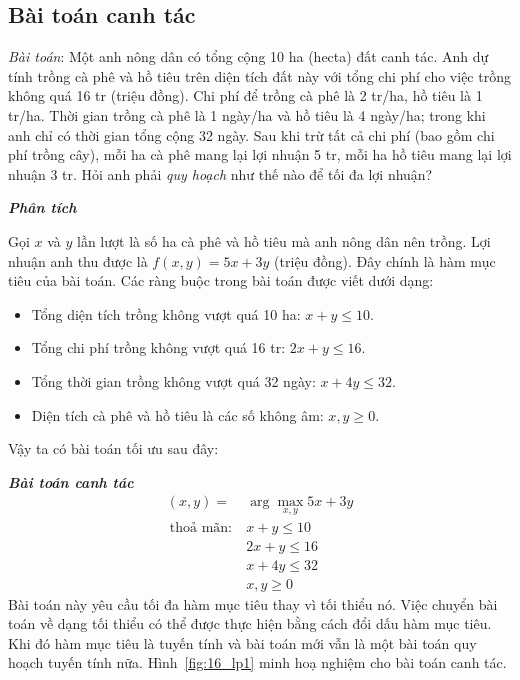 
 
\subsection{Bài toán canh tác}
 
\textit{{Bài toán}}:
Một anh nông dân có tổng cộng 10 ha (hecta) đất canh tác. Anh dự tính trồng cà
phê và hồ tiêu trên diện tích đất này với tổng chi phí cho việc trồng không quá 16 tr (triệu đồng). Chi phí để trồng cà phê là 2 tr/ha, hồ
tiêu là 1 tr/ha. Thời gian trồng cà phê là 1 ngày/ha và hồ tiêu là 4 ngày/ha;
trong khi anh chỉ có thời gian tổng cộng 32 ngày. Sau khi trừ tất cả chi
phí (bao gồm chi phí trồng cây), mỗi ha cà phê mang lại lợi nhuận 5 tr, mỗi ha hồ
tiêu mang lại lợi nhuận 3 tr. Hỏi anh phải \textit{quy hoạch} như thế nào để tối
đa lợi nhuận? 
 
\newpage 
\textit{\textbf{Phân tích}}

Gọi $x$ và $y$ lần lượt là số ha cà phê và hồ tiêu mà anh nông dân nên trồng.
Lợi nhuận anh thu được là $f(x, y) = 5x + 3y$ (triệu đồng). Đây chính là hàm
mục tiêu của bài toán. Các ràng buộc trong bài toán được viết dưới dạng:
\begin{itemize}
    \item Tổng diện tích trồng không vượt quá 10 ha: $x + y \leq 10$. 
     
    \item Tổng chi phí trồng không vượt quá 16 tr: $2x + y \leq 16$. 
     
    \item Tổng thời gian trồng không vượt quá 32 ngày: $x + 4y \leq 32$. 
     
    \item Diện tích cà phê và hồ tiêu là các số không âm: $x, y \geq 0$. 
\end{itemize}
Vậy ta có bài toán tối ưu sau đây: 


\textit{\textbf{Bài toán canh tác} }
\begin{equation}
\label{eqn:canhtac}
\begin{aligned}
    (x, y) =& \arg\max_{x, y} 5x + 3y \\\ 
    \text{thoả mãn:}~ & x + y \leq 10 \\\ 
                        & 2x + y \leq 16 \\\ 
                        & x + 4y \leq 32 \\\ 
                        & x, y \geq 0 
\end{aligned} 
\end{equation} 
Bài toán này yêu cầu {tối đa hàm mục tiêu} thay vì tối thiểu nó. Việc
chuyển bài toán về dạng {tối thiểu}  có thể được thực hiện bằng cách đổi dấu hàm mục tiêu. Khi đó hàm mục tiêu là tuyến tính và bài toán mới vẫn là một bài toán quy hoạch tuyến tính
nữa. Hình~\ref{fig:16_lp1} minh hoạ nghiệm cho bài toán canh tác. 


